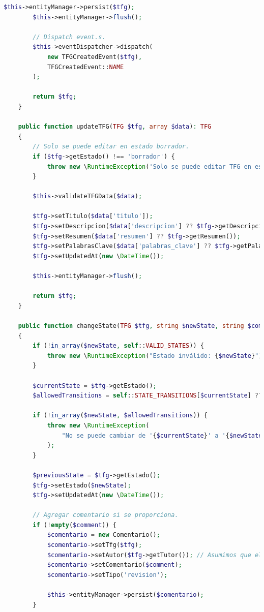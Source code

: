 \documentclass[12pt,a4paper,oneside]{report}
\begin{document}
\begin{lstlisting}[language=PHP]
        $this->entityManager->persist($tfg);
        $this->entityManager->flush();

        // Dispatch event.s.
        $this->eventDispatcher->dispatch(
            new TFGCreatedEvent($tfg),
            TFGCreatedEvent::NAME
        );

        return $tfg;
    }

    public function updateTFG(TFG $tfg, array $data): TFG
    {
        // Solo se puede editar en estado borrador.
        if ($tfg->getEstado() !== 'borrador') {
            throw new \RuntimeException('Solo se puede editar TFG en estado borrador');
        }

        $this->validateTFGData($data);

        $tfg->setTitulo($data['titulo']);
        $tfg->setDescripcion($data['descripcion'] ?? $tfg->getDescripcion());
        $tfg->setResumen($data['resumen'] ?? $tfg->getResumen());
        $tfg->setPalabrasClave($data['palabras_clave'] ?? $tfg->getPalabrasClave());
        $tfg->setUpdatedAt(new \DateTime());

        $this->entityManager->flush();

        return $tfg;
    }

    public function changeState(TFG $tfg, string $newState, string $comment = ''): TFG
    {
        if (!in_array($newState, self::VALID_STATES)) {
            throw new \RuntimeException("Estado inválido: {$newState}");
        }

        $currentState = $tfg->getEstado();
        $allowedTransitions = self::STATE_TRANSITIONS[$currentState] ?? [];

        if (!in_array($newState, $allowedTransitions)) {
            throw new \RuntimeException(
                "No se puede cambiar de '{$currentState}' a '{$newState}'"
            );
        }

        $previousState = $tfg->getEstado();
        $tfg->setEstado($newState);
        $tfg->setUpdatedAt(new \DateTime());

        // Agregar comentario si se proporciona.
        if (!empty($comment)) {
            $comentario = new Comentario();
            $comentario->setTfg($tfg);
            $comentario->setAutor($tfg->getTutor()); // Asumimos que el tutor cambia el estado.
            $comentario->setComentario($comment);
            $comentario->setTipo('revision');
            
            $this->entityManager->persist($comentario);
        }


\end{lstlisting}
\end{document}

